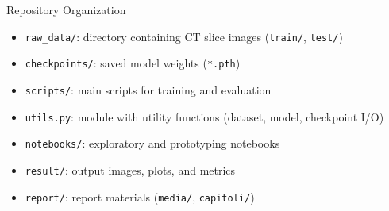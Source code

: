 

\begin{frame}{Repository Organization}
  \begin{itemize}
    \item \texttt{raw\_data/}: directory containing CT slice images (\texttt{train/}, \texttt{test/})
    \item \texttt{checkpoints/}: saved model weights (\texttt{*.pth})
    \item \texttt{scripts/}: main scripts for training and evaluation
    \item \texttt{utils.py}: module with utility functions (dataset, model, checkpoint I/O)
    \item \texttt{notebooks/}: exploratory and prototyping notebooks
    \item \texttt{result/}: output images, plots, and metrics
    \item \texttt{report/}: report materials (\texttt{media/}, \texttt{capitoli/})
  \end{itemize}
\end{frame}


